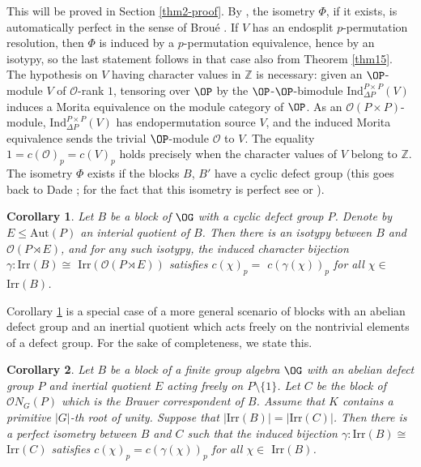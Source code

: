 \documentclass{amsart} %
\theoremstyle{plain}\newtheorem{Theorem}{Theorem}[section]
\theoremstyle{plain}\newtheorem{Conjecture}[Theorem]{Conjecture}
\theoremstyle{plain}\newtheorem{Corollary}[Theorem]{Corollary}
\theoremstyle{plain}\newtheorem{Lemma}[Theorem]{Lemma}
\theoremstyle{plain}\newtheorem{Proposition}[Theorem]{Proposition}
\theoremstyle{definition}\newtheorem{Definition}[Theorem]{Definition}
\theoremstyle{definition}\newtheorem{Example}[Theorem]{Example}
\theoremstyle{definition}\newtheorem{Examples}[Theorem]{Examples}
\theoremstyle{definition}\newtheorem{Remark}[Theorem]{Remark}
\theoremstyle{definition}\newtheorem{Remarks}[Theorem]{Remarks}
\theoremstyle{plain}\newtheorem{Statement}[Theorem]{}
\def\CO{{\mathcal{O}}}
\def\Z{{\mathbb Z}}
\def\Aut{\mathrm{Aut}}           \def\tenk{\otimes_k}
\def\Ind{\mathrm{Ind}}           \def\tenK{\otimes_K}
\def\Irr{\mathrm{Irr}}           \def\tenK{\otimes_K}
\begin{document}
This will be proved in Section \ref{thm2-proof}.   
By \cite[Proposition 3.3]{KL10},
the isometry $\Phi$, if it exists, is automatically perfect in the sense of 
Brou\'e \cite{Broue88}.   If $V$ has an endosplit $p$-permutation resolution, then
$\Phi$ is induced by a $p$-permutation equivalence, hence by an isotypy, so the
last statement follows in that case also from Theorem \ref{thm15}.
The hypothesis on
 $V$ having character values in $\Z$ is necessary: given an $\OP$-module
 $V $ of $\CO$-rank $1$, tensoring over $\OP$ by the $\OP$-$\OP$-bimodule 
 $\Ind^{P\times P}_{\Delta P}(V)$
 induces a Morita equivalence on the module category of $\OP$. As an 
 $\CO(P\times P)$-module, $\Ind^{P\times P}_{\Delta P}(V)$ has 
 endopermutation source $V$, and the induced Morita equivalence  sends the trivial 
 $\OP$-module $\CO$ to $V$. 
 The equality $1=c(\CO)_p=c(V)_p$ holds precisely when the character values of $V$
 belong to $\Z$. The isometry $\Phi$ exists if the blocks $B$, $B'$ have a cyclic defect 
 group (this goes back to Dade \cite{Dadecyclic}; for the fact that this isometry is
 perfect see  \cite{Licycliccentre} or \cite[Theorem 11.10.2]{LiBookII}).
 

\begin{Corollary} \label{Cor2}
Let $B$ be a block of $\OG$ with a cyclic defect group $P$.
 Denote by $E\leq \Aut(P)$ an interial quotient of $B$.
Then there is an isotypy between $B$ and $\CO(P\rtimes E)$, and for any such
isotypy, the induced character bijection $\gamma : \Irr(B)\cong$ $\Irr(\CO(P\rtimes E))$
satisfies $c(\chi)_p=$ $c(\gamma(\chi))_p$ for all $\chi\in$ $\Irr(B)$.
\end{Corollary}

Corollary \ref{Cor2} is a special case of a more general scenario
of blocks with an abelian defect group and an inertial quotient which acts freely
on the nontrivial elements of a defect group. For the sake of completeness, 
we state this.

\begin{Corollary}\label{Cor3}
Let $B$ be a block of a finite group algebra $\OG$ with an abelian defect group $P$ 
and inertial quotient $E$ acting freely on $P\setminus \{1\}$. Let $C$ be the
block of $\CO N_G(P)$ which is the Brauer correspondent of $B$.
Assume that $K$ contains a primitive $|G|$-th root of unity.
Suppose that $|\Irr(B)|=|\Irr(C)|$. Then there is a perfect isometry between
$B$ and $C$ such that the induced bijection $\gamma : \Irr(B)\cong$ $\Irr(C)$
satisfies $c(\chi)_p=c(\gamma(\chi))_p$ for all $\chi\in$ $\Irr(B)$.
\end{Corollary}
\end{document}
